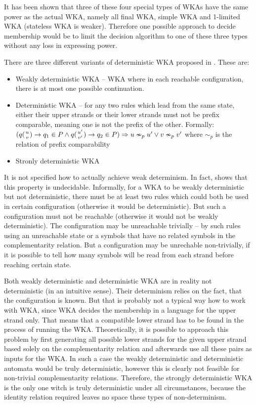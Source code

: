 It has been shown that three of these four special types of WKAs have the same power as the actual WKA, namely all final WKA, simple WKA and 1-limited WKA (stateless WKA is weaker). Therefore one possible approach to decide membership would be to limit the decision algorithm to one of these three types without any loss in expressing power.

There are three different variants of deterministic WKA proposed in \cite{DETERM_WKA}. These are:
\begin{itemize}
  \item{Weakly deterministic WKA -- WKA where in each reachable configuration, there is at most one possible continuation.}
  \item{Deterministic WKA -- for any two rules which lead from the same state, either their upper strands or their lower strands must not be prefix comparable, meaning one is not the prefix of the other. Formally: $(q({u \atop v}) \rightarrow q_1 \in P \wedge q({u' \atop v'}) \rightarrow q_2 \in P) \Rightarrow u \nsim_p u' \vee v \nsim_p v'$ where $\sim_p$ is the relation of prefix comparability}
  \item{Stronly deterministic WKA}
\end{itemize}

It is not specified how to actually achieve weak determinism. In fact, \cite{DETERM_WKA} shows that this property is undecidable. Informally, for a WKA to be weakly deterministic but not deterministic, there must be at least two rules which could both be used in certain configuration (otherwise it would be deterministic). But such a configuration must not be reachable (otherwise it would not be weakly deterministic). The configuration may be unreachable trivially -- by such rules using an unreachable state or a symbols that have no related symbols in the complementarity relation. But a configuration may be unrechable non-trivially, if it is possible to tell how many symbols will be read from each strand before reaching certain state.

Both weakly deterministic and deterministic WKA are in reality not deterministic (in an intuitive sense). Their determinism relies on the fact, that the configuration is known. But that is probably not a typical way how to work with WKA, since WKA decides the membership in a language for the upper strand only. That means that a compatible lower strand has to be found in the process of running the WKA. Theoretically, it is possible to approach this problem by first generating all possible lower strands for the given upper strand based solely on the complementarity relation and afterwards use all these pairs as inputs for the WKA. In such a case the weakly deterministic and deterministic automata would be truly deterministic, however this is clearly not feasible for non-trivial complementarity relations. Therefore, the strongly deterministic WKA is the only one witch is truly deterministic under all circumstances, because the identity relation required leaves no space these types of non-determinism.

